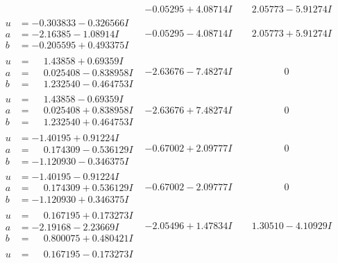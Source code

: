 \documentclass[1p]{elsarticle_modified}
\theoremstyle{definition}
\begin{document}
$$\begin{array}{c|c|c}
 & -0.05295 + 4.08714 I & \phantom{-}2.05773 - 5.91274 I \\ \hline\begin{aligned}
u &= -0.303833 - 0.326566 I \\
a &= -2.16385 - 1.08914 I \\
b &= -0.205595 + 0.493375 I\end{aligned}
 & -0.05295 - 4.08714 I & \phantom{-}2.05773 + 5.91274 I \\ \hline\begin{aligned}
u &= \phantom{-}1.43858 + 0.69359 I \\
a &= \phantom{-}0.025408 - 0.838958 I \\
b &= \phantom{-}1.232540 - 0.464753 I\end{aligned}
 & -2.63676 - 7.48274 I & \phantom{-0.000000 } 0 \\ \hline\begin{aligned}
u &= \phantom{-}1.43858 - 0.69359 I \\
a &= \phantom{-}0.025408 + 0.838958 I \\
b &= \phantom{-}1.232540 + 0.464753 I\end{aligned}
 & -2.63676 + 7.48274 I & \phantom{-0.000000 } 0 \\ \hline\begin{aligned}
u &= -1.40195 + 0.91224 I \\
a &= \phantom{-}0.174309 - 0.536129 I \\
b &= -1.120930 - 0.346375 I\end{aligned}
 & -0.67002 + 2.09777 I & \phantom{-0.000000 } 0 \\ \hline\begin{aligned}
u &= -1.40195 - 0.91224 I \\
a &= \phantom{-}0.174309 + 0.536129 I \\
b &= -1.120930 + 0.346375 I\end{aligned}
 & -0.67002 - 2.09777 I & \phantom{-0.000000 } 0 \\ \hline\begin{aligned}
u &= \phantom{-}0.167195 + 0.173273 I \\
a &= -2.19168 - 2.23669 I \\
b &= \phantom{-}0.800075 + 0.480421 I\end{aligned}
 & -2.05496 + 1.47834 I & \phantom{-}1.30510 - 4.10929 I \\ \hline\begin{aligned}
u &= \phantom{-}0.167195 - 0.173273 I \\

\end{aligned}
\end{array}$$
\end{document}
